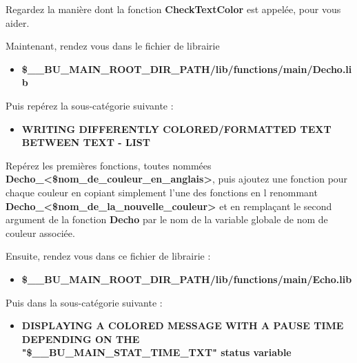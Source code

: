 \documentclass[a4paper,10pt]{article}
\begin{document}
\begin{justify}
    Regardez la manière dont la fonction \textbf{\color{mauve}CheckTextColor} est appelée, pour vous aider.\\[1\baselineskip]
\end{justify}

\begin{justify}
	Maintenant, rendez vous dans le fichier de librairie

	\begin{itemize}
    	\item \textbf{\color{orange}\$\_\_BU\_MAIN\_ROOT\_DIR\_PATH\color{lime}/lib/functions/main/Decho.lib}
	\end{itemize}
\end{justify}

\begin{justify}
	Puis repérez la sous-catégorie suivante :

	\begin{itemize}
    	\item \textbf{WRITING DIFFERENTLY COLORED/FORMATTED TEXT BETWEEN TEXT - LIST}
	\end{itemize}
\end{justify}

\begin{justify}
	Repérez les premières fonctions, toutes nommées \textbf{\color{mauve}Decho\_<\$nom\_de\_couleur\_en\_anglais>}, puis ajoutez une fonction pour chaque couleur en copiant simplement l'une des fonctions en l renommant \textbf{\color{mauve}Decho\_<\$nom\_de\_la\_nouvelle\_couleur>} et en remplaçant le second argument de la fonction \textbf{\color{mauve}Decho} par le nom de la variable globale de nom de couleur associée.\\[1\baselineskip]
\end{justify}

\begin{justify}
	Ensuite, rendez vous dans ce fichier de librairie :

	\begin{itemize}
		\item \textbf{\color{orange}\$\_\_BU\_MAIN\_ROOT\_DIR\_PATH\color{lime}/lib/functions/main/Echo.lib}
	\end{itemize}		
\end{justify}

\begin{justify}
	Puis dans la sous-catégorie suivante :
	
	\begin{itemize}
    	\item \textbf{DISPLAYING A COLORED MESSAGE WITH A PAUSE TIME DEPENDING ON THE\\ "\$\_\_BU\_MAIN\_STAT\_TIME\_TXT" status variable}
	\end{itemize}
\end{justify}
\end{document}
